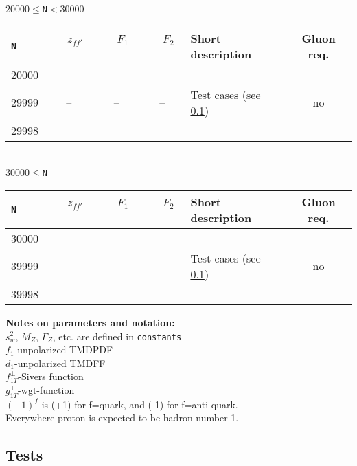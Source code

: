 \documentclass[prd,nofootinbib,eqsecnum,final]{revtex4}
\renewcommand{\(}{\left(}
\renewcommand{\)}{\right)}
\renewcommand{\[}{\left[}
\renewcommand{\]}{\right]}
\begin{document}
\begin{center}
20000$\leqslant$\texttt{N}$<$30000
\\
\begin{tabular}{||l|c|c|c||p{8cm}|c||}
\hline\hline
\texttt{N} & ~~$z_{ff'}$~~& ~~$F_1$~~ & ~~$F_2$~~&  Short description & Gluon req. 
\\\hline
20000 &  &  &  &  & 
\\
29999 & -- & -- & -- & Test cases (see \ref{TMDF:tests}) & no
\\
29998 &  &  &  &  & 
\\\hline\hline
\end{tabular}
\\
30000$\leqslant$\texttt{N}
\\
\begin{tabular}{||l|c|c|c||p{8cm}|c||}
\hline\hline
\texttt{N} & ~~$z_{ff'}$~~& ~~$F_1$~~ & ~~$F_2$~~&  Short description & Gluon req. 
\\\hline
30000 &  &  &  &  & 
\\
39999 & -- & -- & -- & Test cases (see \ref{TMDF:tests}) & no
\\
39998 &  &  &  &  & 
\\\hline\hline
\end{tabular}
\end{center}

\textbf{Notes on parameters and notation:} 
\\
$s_w^2$, $M_Z$, $\Gamma_Z$, etc. are defined in \texttt{constants}
\\
$f_1$-unpolarized TMDPDF
\\
$d_1$-unpolarized TMDFF
\\
$f_{1T}^\perp$-Sivers function
\\
$g_{1T}^\perp$-wgt-function
\\
$(-1)^f$ is (+1) for f=quark, and (-1) for f=anti-quark.
\\
Everywhere proton is expected to be hadron number 1.


\subsection{Tests}
\label{TMDF:tests}
\end{document}
